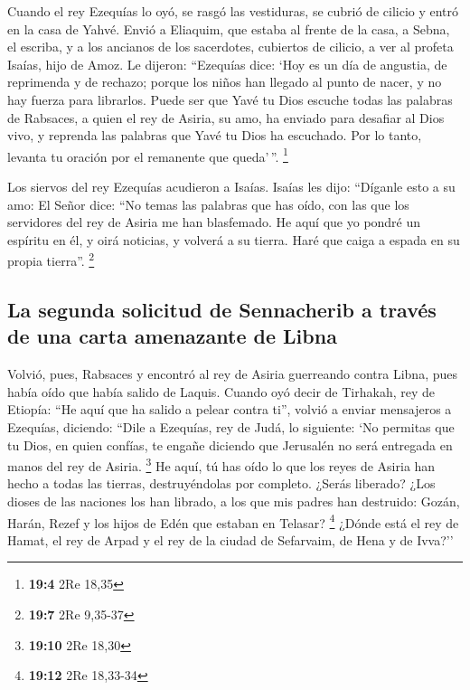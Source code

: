 \begin{paracol}{2}
 Cuando el rey Ezequías lo oyó, se rasgó las vestiduras,
se cubrió de cilicio y entró en la casa de Yahvé.  Envió a
Eliaquim, que estaba al frente de la casa, a Sebna, el escriba, y a los
ancianos de los sacerdotes, cubiertos de cilicio, a ver al profeta
Isaías, hijo de Amoz.  Le dijeron: ``Ezequías dice: `Hoy
es un día de angustia, de reprimenda y de rechazo; porque los niños han
llegado al punto de nacer, y no hay fuerza para librarlos.
 Puede ser que Yavé tu Dios escuche todas las palabras de
Rabsaces, a quien el rey de Asiria, su amo, ha enviado para desafiar al
Dios vivo, y reprenda las palabras que Yavé tu Dios ha escuchado. Por lo
tanto, levanta tu oración por el remanente que queda'\,''. \footnote{\textbf{19:4}
  2Re 18,35}

 Los siervos del rey Ezequías acudieron a Isaías.
 Isaías les dijo: ``Díganle esto a su amo: El Señor dice:
``No temas las palabras que has oído, con las que los servidores del rey
de Asiria me han blasfemado.  He aquí que yo pondré un
espíritu en él, y oirá noticias, y volverá a su tierra. Haré que caiga a
espada en su propia tierra''. \footnote{\textbf{19:7} 2Re 9,35-37}

\hypertarget{la-segunda-solicitud-de-sennacherib-a-travuxe9s-de-una-carta-amenazante-de-libna}{%
\subsection{La segunda solicitud de Sennacherib a través de una carta
amenazante de
Libna}\label{la-segunda-solicitud-de-sennacherib-a-travuxe9s-de-una-carta-amenazante-de-libna}}

 Volvió, pues, Rabsaces y encontró al rey de Asiria
guerreando contra Libna, pues había oído que había salido de Laquis.
 Cuando oyó decir de Tirhakah, rey de Etiopía: ``He aquí
que ha salido a pelear contra ti'', volvió a enviar mensajeros a
Ezequías, diciendo:  ``Dile a Ezequías, rey de Judá, lo
siguiente: `No permitas que tu Dios, en quien confías, te engañe
diciendo que Jerusalén no será entregada en manos del rey de Asiria.
\footnote{\textbf{19:10} 2Re 18,30}  He aquí, tú has oído
lo que los reyes de Asiria han hecho a todas las tierras, destruyéndolas
por completo. ¿Serás liberado?  ¿Los dioses de las
naciones los han librado, a los que mis padres han destruido: Gozán,
Harán, Rezef y los hijos de Edén que estaban en Telasar? \footnote{\textbf{19:12}
  2Re 18,33-34}  ¿Dónde está el rey de Hamat, el rey de
Arpad y el rey de la ciudad de Sefarvaim, de Hena y de Ivva?''


\end{paracol}
